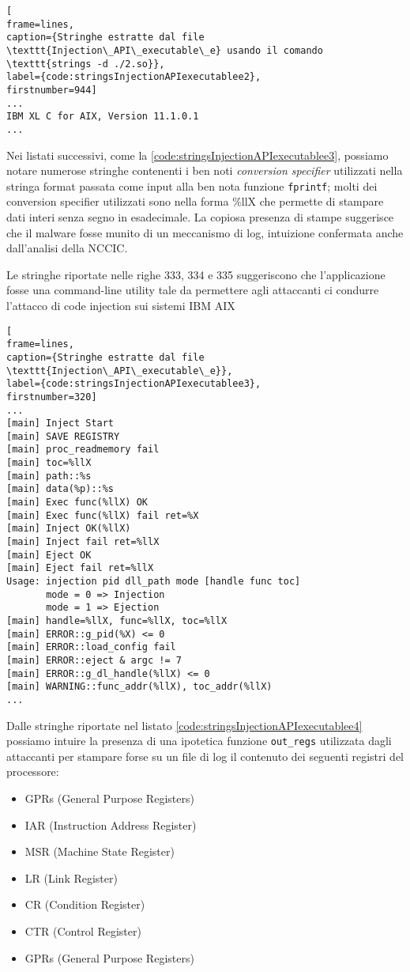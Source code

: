 \documentclass[10pt,a4paper, titlepage]{report}
\begin{document}
\begin{lstlisting}[
frame=lines, 
caption={Stringhe estratte dal file \texttt{Injection\_API\_executable\_e} usando il comando \texttt{strings -d ./2.so}}, 
label={code:stringsInjectionAPIexecutablee2},
firstnumber=944]
...
IBM XL C for AIX, Version 11.1.0.1
...
\end{lstlisting}

Nei listati successivi, come la \ref{code:stringsInjectionAPIexecutablee3}, possiamo notare numerose stringhe contenenti i ben noti \textit{conversion specifier} utilizzati nella stringa format passata come input alla ben nota funzione \texttt{fprintf}; molti dei conversion specifier utilizzati sono nella forma \%llX che permette di stampare dati interi senza segno in esadecimale. La copiosa presenza di stampe suggerisce che il malware fosse munito di un meccanismo di log, intuizione confermata anche dall'analisi della NCCIC.

Le stringhe riportate nelle righe 333, 334 e 335 suggeriscono che l'applicazione fosse una command-line utility tale da permettere agli attaccanti ci condurre l'attacco di code injection sui sistemi IBM AIX

\begin{lstlisting}[
frame=lines, 
caption={Stringhe estratte dal file \texttt{Injection\_API\_executable\_e}}, 
label={code:stringsInjectionAPIexecutablee3},
firstnumber=320]
...
[main] Inject Start
[main] SAVE REGISTRY
[main] proc_readmemory fail
[main] toc=%llX
[main] path::%s
[main] data(%p)::%s
[main] Exec func(%llX) OK
[main] Exec func(%llX) fail ret=%X
[main] Inject OK(%llX)
[main] Inject fail ret=%llX
[main] Eject OK
[main] Eject fail ret=%llX
Usage: injection pid dll_path mode [handle func toc]
       mode = 0 => Injection
       mode = 1 => Ejection
[main] handle=%llX, func=%llX, toc=%llX
[main] ERROR::g_pid(%X) <= 0
[main] ERROR::load_config fail
[main] ERROR::eject & argc != 7
[main] ERROR::g_dl_handle(%llX) <= 0
[main] WARNING::func_addr(%llX), toc_addr(%llX)
...
\end{lstlisting}

Dalle stringhe riportate nel listato \ref{code:stringsInjectionAPIexecutablee4} possiamo intuire la presenza di una ipotetica funzione \texttt{out\_regs} utilizzata dagli attaccanti per stampare forse su un file di log il contenuto dei seguenti registri del processore:
\begin{itemize}
\item GPRs (General Purpose Registers)
\item IAR (Instruction Address Register)
\item MSR (Machine State Register)
\item LR (Link Register)
\item CR (Condition Register)
\item CTR (Control Register)
\item GPRs (General Purpose Registers)
\end{itemize}
\end{document}

